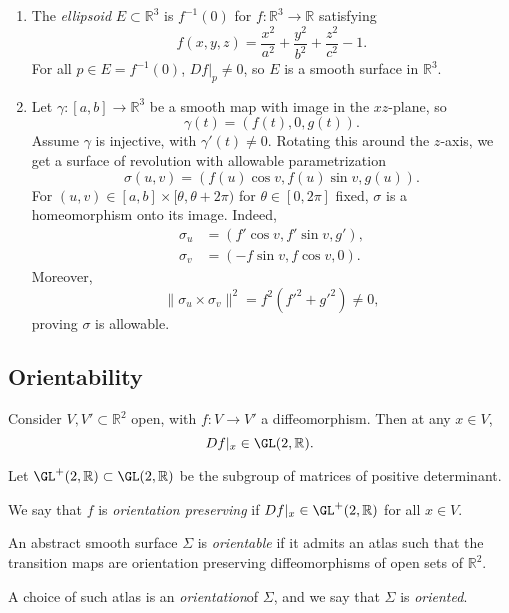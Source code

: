 \documentclass[12pt]{article}
\begin{document}
\begin{exbox}
	\begin{enumerate}[1.]
		\item The \emph{ellipsoid} $E \subset \mathbb{R}^3$ is $f^{-1}(0)$ for $f : \mathbb{R}^3 \to \mathbb{R}$ satisfying
			\[
			f(x, y, z) = \frac{x^2}{a^2} + \frac{y^2}{b^2} + \frac{z^2}{c^2} - 1
			.\]
			For all $p \in E = f^{-1}(0)$, $Df|_p \neq 0$, so $E$ is a smooth surface in $\mathbb{R}^3$.
		\item Let $\gamma : [a, b] \to \mathbb{R}^3$ be a smooth map with image in the $xz$-plane, so
			\[
			\gamma(t) = (f(t), 0, g(t))
			.\]
			Assume $\gamma$ is injective, with $\gamma'(t) \neq 0$. Rotating this around the $z$-axis, we get a surface of revolution with allowable parametrization %
			\[
			\sigma(u, v) = (f(u) \cos v, f(u) \sin v, g(u))
			.\]
			For $(u, v) \in [a, b] \times [\theta, \theta + 2 \pi)$ for $\theta \in [0, 2\pi]$ fixed, $\sigma$ is a homeomorphism onto its image. Indeed,
			\begin{align*}
				\sigma_u &= (f' \cos v, f' \sin v, g'), \\
				\sigma_v &= (-f \sin v, f \cos v, 0).
			\end{align*}
			Moreover,
			\[
			\| \sigma_u \times \sigma_v \|^2 = f^2 (f'^2 + g'^2) \neq 0
			,\]
			proving $\sigma$ is allowable.
	\end{enumerate}
\end{exbox}

\subsection{Orientability}
\label{sub:orientability}

Consider $V, V' \subset \mathbb{R}^2$ open, with $f : V \to V'$ a diffeomorphism. Then at any $x \in V$,
\[
	Df|_x \in \GL(2,\mathbb{R})
.\]

Let $\GL^{+}(2, \mathbb{R}) \subset \GL(2, \mathbb{R})$ be the subgroup of matrices of positive determinant.

\begin{definition}
	We say that $f$ is \emph{orientation preserving} if $Df|_x \in \GL^{+}(2, \mathbb{R})$ for all $x \in V$.
\end{definition}

\begin{definition}
	An abstract smooth surface $\Sigma$ is \emph{orientable} if it admits an atlas such that the transition maps are orientation preserving diffeomorphisms of open sets of $\mathbb{R}^2$.

	A choice of such atlas is an \emph{orientation}of $\Sigma$, and we say that $\Sigma$ is \emph{oriented}.
\end{definition}
\end{document}
